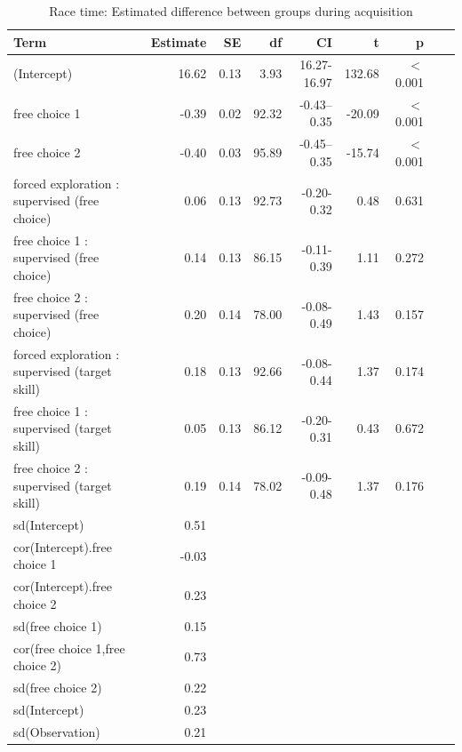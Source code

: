 \documentclass[pdflatex,sn-nature]{sn-jnl}%
\theoremstyle{thmstyleone}%
\theoremstyle{thmstyletwo}%
\theoremstyle{thmstylethree}%
\begin{document}
\begin{appendices}
\begin{table}[h!]
\caption{Race time: Estimated difference between groups during acquisition}\label{table_racetime_acquisition_groupdifference}
\centering
\begin{tabular}{lrrrrrrrr}
  \hline
 Term & Estimate & SE & df & CI & t & p \\ 
  \hline
 (Intercept) & 16.62 & 0.13 & 3.93 & 16.27-16.97 & 132.68 &  $<$  0.001 \\ 
 free choice 1 & -0.39 & 0.02 & 92.32 & -0.43--0.35 & -20.09 &  $<$  0.001 \\ 
  free choice 2 & -0.40 & 0.03 & 95.89 & -0.45--0.35 & -15.74 &  $<$  0.001 \\ 
  forced exploration : supervised (free choice) & 0.06 & 0.13 & 92.73 & -0.20-0.32 & 0.48 &    0.631 \\ 
  free choice 1 : supervised (free choice) & 0.14 & 0.13 & 86.15 & -0.11-0.39 & 1.11 &   0.272 \\ 
  free choice 2 : supervised (free choice) & 0.20 & 0.14 & 78.00 & -0.08-0.49 & 1.43 &   0.157 \\ 
  forced exploration : supervised (target skill) & 0.18 & 0.13 & 92.66 & -0.08-0.44 & 1.37 &   0.174 \\ 
  free choice 1 : supervised (target skill) & 0.05 & 0.13 & 86.12 & -0.20-0.31 & 0.43 &   0.672 \\ 
  free choice 2 : supervised (target skill) & 0.19 & 0.14 & 78.02 & -0.09-0.48 & 1.37 &   0.176 \\ 
  sd(Intercept) & 0.51 &  &  &  &  &    \\ 
  cor(Intercept).free choice 1 & -0.03 &  &  &  &  &    \\ 
  cor(Intercept).free choice 2 & 0.23 &  &  &  &  &    \\ 
  sd(free choice 1) & 0.15 &  &  &  &  &    \\ 
  cor(free choice 1,free choice 2) & 0.73 &  &  &  &  &   \\ 
  sd(free choice 2) & 0.22 &  &  &  &  &    \\ 
  sd(Intercept) & 0.23 &  &  &  &  &   \\ 
  sd(Observation) & 0.21 &  &  &  &   &  \\ 
   \hline
\end{tabular}
\end{table}











\end{appendices}
\end{document}
